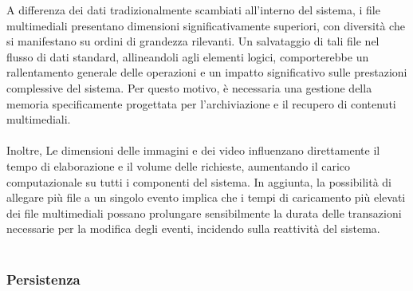 A differenza dei dati tradizionalmente scambiati all’interno del sistema, i file multimediali presentano dimensioni significativamente superiori, 
con diversità che si manifestano su ordini di grandezza rilevanti. 
Un salvataggio di tali file nel flusso di dati standard, allineandoli agli elementi logici, 
comporterebbe un rallentamento generale delle operazioni e un impatto significativo sulle prestazioni complessive del sistema. 
Per questo motivo, è necessaria una gestione della memoria specificamente progettata per l’archiviazione e il recupero di contenuti multimediali.	\\
\\
Inoltre, Le dimensioni delle immagini e dei video influenzano direttamente il tempo di elaborazione e il volume delle richieste, 
aumentando il carico computazionale su tutti i componenti del sistema. 
In aggiunta, la possibilità di allegare più file a un singolo evento implica che i tempi di caricamento più elevati dei file multimediali 
possano prolungare sensibilmente la durata delle transazioni necessarie per la modifica degli eventi, incidendo sulla reattività del sistema.\\
\\
\clearpage
\subsubsection{Persistenza}

